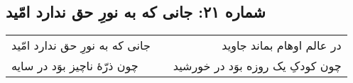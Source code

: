 \begin{center}
\section*{شماره ۲۱: جانی که به نورِ حق ندارد امّید}
\label{sec:021}
\begin{longtable}{l p{0.5cm} r}
جانی که به نورِ حق ندارد امّید
&&
در عالم اوهام بماند جاوید
\\
چون ذرّهٔ ناچیز بوَد در سایه
&&
چون کودکِ یک روزه بوَد در خورشید
\\
\end{longtable}
\end{center}
